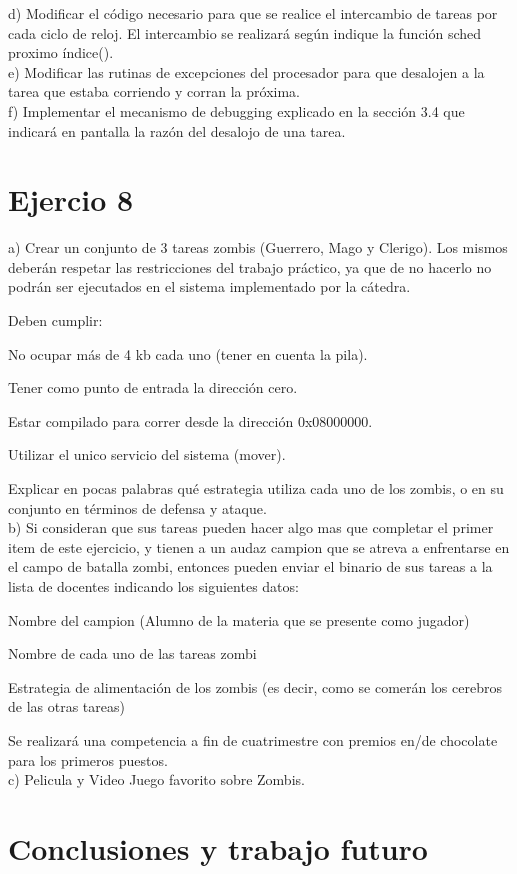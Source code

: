 \documentclass[a4paper]{article}
\begin{document}
{\large d)} Modificar el c\'odigo necesario para que se realice el intercambio de tareas por cada ciclo de
reloj. El intercambio se realizar\'a seg\'un indique la funci\'on sched proximo \'indice().\\

{\large e)} Modificar las rutinas de excepciones del procesador para que desalojen a la tarea que
estaba corriendo y corran la pr\'oxima.\\

{\large f)} Implementar el mecanismo de debugging explicado en la secci\'on 3.4 que indicar\'a en pantalla
la raz\'on del desalojo de una tarea.


\newpage
\section{Ejercio 8}
{\large a)} Crear un conjunto de 3 tareas zombis (Guerrero, Mago y Clerigo). Los mismos deber\'an respetar
las restricciones del trabajo pr\'actico, ya que de no hacerlo no podr\'an ser ejecutados
en el sistema implementado por la c\'atedra.

Deben cumplir:

No ocupar m\'as de 4 kb cada uno (tener en cuenta la pila).

Tener como punto de entrada la direcci\'on cero.

Estar compilado para correr desde la direcci\'on 0x08000000.

Utilizar el unico servicio del sistema (mover).

Explicar en pocas palabras qu\'e estrategia utiliza cada uno de los zombis, o en su conjunto
en t\'erminos de defensa y ataque.\\

{\large b)} Si consideran que sus tareas pueden hacer algo mas que completar el primer item de este
ejercicio, y tienen a un audaz campion que se atreva a enfrentarse en el campo de batalla
zombi, entonces pueden enviar el binario de sus tareas a la lista de docentes indicando
los siguientes datos:

Nombre del campion (Alumno de la materia que se presente como jugador)

Nombre de cada uno de las tareas zombi

Estrategia de alimentaci\'on de los zombis (es decir, como se comer\'an los cerebros de
las otras tareas)

Se realizar\'a una competencia a fin de cuatrimestre con premios en/de chocolate para los
primeros puestos. \\

{\large c)} Pelicula y Video Juego favorito sobre Zombis.


\newpage
\section{Conclusiones y trabajo futuro}
\end{document}
